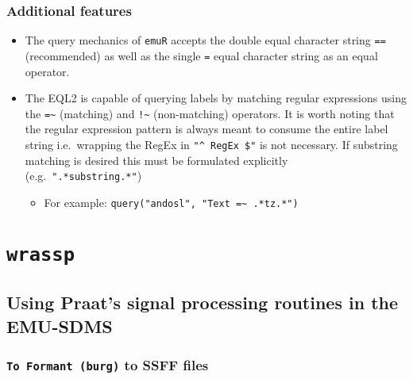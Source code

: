 \documentclass[
]{book}
\providecommand{\tightlist}{%
  \setlength{\itemsep}{0pt}\setlength{\parskip}{0pt}}
\begin{document}
\hypertarget{additional-features}{%
\subsection{Additional features}\label{additional-features}}

\begin{itemize}
\tightlist
\item
  The query mechanics of \texttt{emuR} accepts the double equal character string \texttt{==} (recommended) as well as the single \texttt{=} equal character string as an equal operator.
\item
  The EQL2 is capable of querying labels by matching regular expressions using the \texttt{=\textasciitilde{}} (matching) and \texttt{!\textasciitilde{}} (non-matching) operators. It is worth noting that the regular expression pattern is always meant to consume the entire label string i.e.~wrapping the RegEx in \texttt{"\^{}\ RegEx\ \$"} is not necessary. If substring matching is desired this must be formulated explicitly (e.g.~\texttt{".*substring.*"})

  \begin{itemize}
  \tightlist
  \item
    For example: \texttt{query("andosl",\ "Text\ =\textasciitilde{}\ .*tz.*")}
  \end{itemize}
\end{itemize}

\hypertarget{app-chap:wrassp}{%
\chapter{\texorpdfstring{\texttt{wrassp}}{wrassp}}\label{app-chap:wrassp}}

\hypertarget{sec:app-chap-wrassp-praatsSigProc}{%
\section{Using Praat's signal processing routines in the EMU-SDMS}\label{sec:app-chap-wrassp-praatsSigProc}}

\hypertarget{to-formant-burg-to-ssff-files}{%
\subsection{\texorpdfstring{\texttt{To\ Formant\ (burg)} to SSFF files}{To Formant (burg) to SSFF files}}\label{to-formant-burg-to-ssff-files}}
\end{document}
